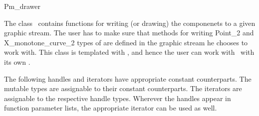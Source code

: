 
\ccRefPageBegin


\begin{ccRefConcept}{Pm_drawer}


\ccDefinition
The class \ccRefName\ contains functions for writing (or drawing) the  componenets to a given graphic stream. 
The user has to make sure that methods for writing Point_2 and X_monotone_curve_2 types of  are defined in the graphic stream he chooses to work with.
This class is templated with , and hence the user can work with \ccRefName\ with its own . 
 

\ccTypes

The following handles and iterators have appropriate constant counterparts. The mutable types are assignable to their
constant counterparts. The iterators are assignable to the respective handle types. 
Wherever the handles appear in function parameter lists, the appropriate iterator can be used as well. 

\end{ccRefConcept}
